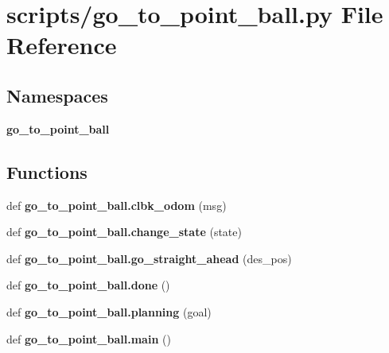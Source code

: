 \section{scripts/go\+\_\+to\+\_\+point\+\_\+ball.py File Reference}
\label{go__to__point__ball_8py}
\subsection*{Namespaces}
\begin{DoxyCompactItemize}
\item 
 \textbf{ go\+\_\+to\+\_\+point\+\_\+ball}
\end{DoxyCompactItemize}
\subsection*{Functions}
\begin{DoxyCompactItemize}
\item 
def \textbf{ go\+\_\+to\+\_\+point\+\_\+ball.\+clbk\+\_\+odom} (msg)
\item 
def \textbf{ go\+\_\+to\+\_\+point\+\_\+ball.\+change\+\_\+state} (state)
\item 
def \textbf{ go\+\_\+to\+\_\+point\+\_\+ball.\+go\+\_\+straight\+\_\+ahead} (des\+\_\+pos)
\item 
def \textbf{ go\+\_\+to\+\_\+point\+\_\+ball.\+done} ()
\item 
def \textbf{ go\+\_\+to\+\_\+point\+\_\+ball.\+planning} (goal)
\item 
def \textbf{ go\+\_\+to\+\_\+point\+\_\+ball.\+main} ()
\end{DoxyCompactItemize}
